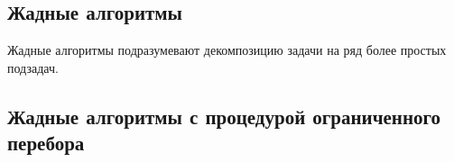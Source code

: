 \subsection{Жадные алгоритмы}
Жадные алгоритмы подразумевают декомпозицию задачи на ряд более простых подзадач.

\subsection{Жадные алгоритмы с процедурой ограниченного перебора}